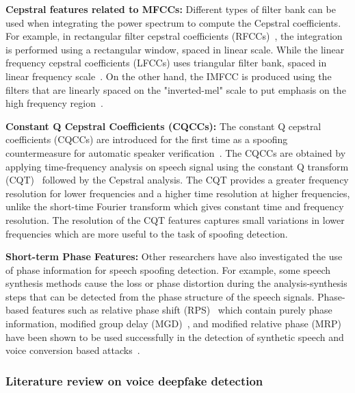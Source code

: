 \textbf{Cepstral features related to MFCCs:}
Different types of filter bank can be used when integrating the power spectrum to compute the Cepstral coefficients. For example, in rectangular filter cepstral coefficients (RFCCs)~\cite{alegre2013}, the integration is performed using a rectangular window, spaced in linear scale. While the linear frequency cepstral coefficients (LFCCs) uses triangular filter bank, spaced in linear frequency scale~\cite{hasan2013}. On the other hand, the IMFCC is produced using the filters that are linearly spaced on the "inverted-mel" scale to put emphasis on the high frequency region~\cite{chakroborty2007}.

\textbf{Constant Q Cepstral Coefficients (CQCCs):}
The constant Q cepstral coefficients (CQCCs) are introduced for the first time as a spoofing countermeasure for automatic speaker verification~\cite{Todisco2017}.  
The CQCCs are obtained by applying time-frequency analysis on speech signal using the constant Q transform (CQT)~\cite{Youngberg1978} followed by the Cepstral analysis.
The CQT provides a greater frequency resolution for lower frequencies and a higher time resolution at higher frequencies, unlike the short-time Fourier transform which
gives constant time and frequency resolution. The resolution of the CQT features captures small variations in lower frequencies which are more useful to the task of spoofing detection.

\textbf{Short-term Phase Features:}
Other researchers have also investigated the use of phase information for speech spoofing detection. For example, some speech synthesis methods cause the loss or phase distortion during the analysis-synthesis steps that can be detected from the phase structure of the speech signals. Phase-based features such as relative phase shift (RPS)~\cite{sanchez2015} which contain purely phase information, modified group delay (MGD)~\cite{wu2012}, and modified relative phase (MRP)~\cite{wang2017} have been shown to be used successfully in the detection of synthetic speech and voice conversion based attacks~\cite{saratxaga2016}.

\subsubsection{Literature review on voice deepfake detection}


